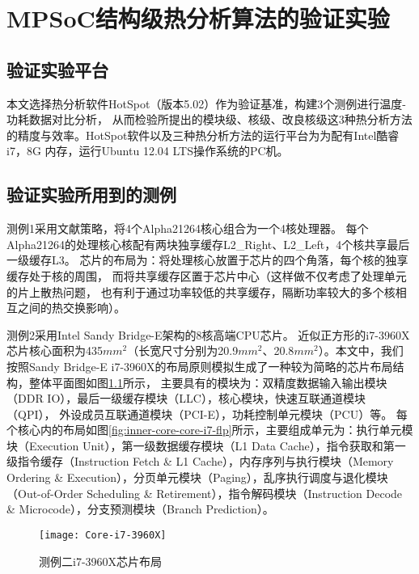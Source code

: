 

\chapter{MPSoC结构级热分析算法的验证实验}
\label{cha:SSTAexperiments}

\section{验证实验平台}
本文选择热分析软件HotSpot（版本5.02）作为验证基准，构建3个测例进行温度-功耗数据对比分析， 从而检验所提出的模块级、核级、改良核级这3种热分析方法的精度与效率。HotSpot软件以及三种热分析方法的运行平台为为配有Intel酷睿i7，8G 内存，运行Ubuntu 12.04 LTS操作系统的PC机。

\section{验证实验所用到的测例}
测例1采用文献策略，将4个Alpha21264核心组合为一个4核处理器。 每个Alpha21264的处理核心核配有两块独享缓存L2\_Right、L2\_Left，4个核共享最后一级缓存L3。 芯片的布局为：将处理核心放置于芯片的四个角落，每个核的独享缓存处于核的周围， 而将共享缓存区置于芯片中心（这样做不仅考虑了处理单元的片上散热问题， 也有利于通过功率较低的共享缓存，隔断功率较大的多个核相互之间的热交换影响）。

测例2采用Intel Sandy Bridge-E架构的8核高端CPU芯片。 近似正方形的i7-3960X芯片核心面积为435$mm^2$（长宽尺寸分别为20.9$mm^2$、20.8$mm^2$）。本文中，我们按照Sandy Bridge-E i7-3960X的布局原则模拟生成了一种较为简略的芯片布局结构，整体平面图如图\ref{fig:core-i7-flp}所示， 主要具有的模块为：双精度数据输入输出模块（DDR IO），最后一级缓存模块（LLC），核心模块，快速互联通道模块（QPI）， 外设成员互联通道模块（PCI-E），功耗控制单元模块（PCU）等。 每个核心内的布局如图\ref{fig:inner-core-core-i7-flp}所示，主要组成单元为：执行单元模块（Execution Unit），第一级数据缓存模块（L1 Data Cache），指令获取和第一级指令缓存（Instruction Fetch \& L1 Cache），内存序列与执行模块（Memory Ordering \& Execution），分页单元模块（Paging），乱序执行调度与退化模块（Out-of-Order Scheduling \& Retirement），指令解码模块（Instruction Decode \& Microcode），分支预测模块（Branch Prediction）。

\begin{figure}[H]
  \centering
  \texttt{[image: Core-i7-3960X]}
  \caption{测例二i7-3960X芯片布局}
  \label{fig:core-i7-flp}
\end{figure}

